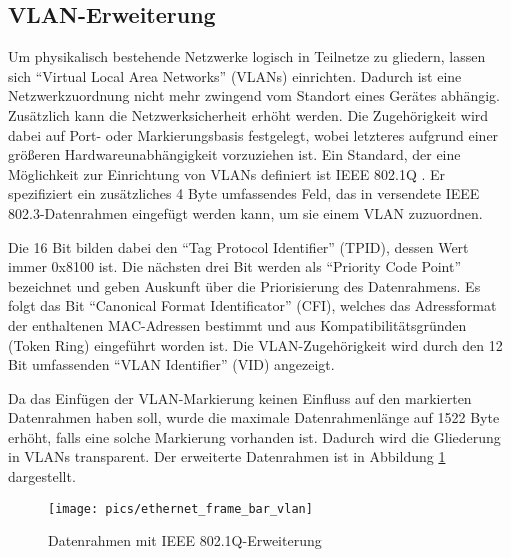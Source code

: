 \subsection{VLAN-Erweiterung}

\label{sec:grundlagen_ethernet_vlan}
Um physikalisch bestehende Netzwerke logisch in Teilnetze zu gliedern,
lassen sich ``Virtual Local Area Networks'' (VLANs)
einrichten. Dadurch ist eine Netzwerkzuordnung nicht mehr zwingend vom
Standort eines Gerätes abhängig. Zusätzlich kann die
Netzwerksicherheit erhöht werden. Die Zugehörigkeit wird dabei auf
Port- oder Markierungsbasis festgelegt, wobei letzteres
aufgrund einer größeren Hardwareunabhängigkeit vorzuziehen ist. Ein
Standard, der eine Möglichkeit zur Einrichtung von VLANs definiert ist
IEEE 802.1Q \cite{vlan2005}. Er spezifiziert ein zusätzliches 4 Byte
umfassendes Feld, das in versendete IEEE 802.3-Datenrahmen eingefügt
werden kann, um sie einem VLAN zuzuordnen. 

Die 16 Bit bilden dabei den ``Tag Protocol Identifier'' (TPID), dessen
Wert immer 0x8100 ist. Die nächsten drei Bit werden als ``Priority Code
Point'' bezeichnet und geben Auskunft über die Priorisierung des
Datenrahmens. Es folgt das Bit ``Canonical Format Identificator''
(CFI), welches das Adressformat der enthaltenen MAC-Adressen
bestimmt und aus Kompatibilitätsgründen (Token Ring) eingeführt worden
ist. Die VLAN-Zugehörigkeit wird durch den 12 Bit umfassenden ``VLAN
Identifier'' (VID) angezeigt. 

Da das Einfügen der VLAN-Markierung keinen Einfluss auf den markierten
Datenrahmen haben soll, wurde die maximale Datenrahmenlänge auf 1522
Byte erhöht, falls eine solche Markierung vorhanden ist. Dadurch wird
die Gliederung in VLANs transparent. Der erweiterte Datenrahmen ist in
Abbildung \ref{fig:grundlagen_ethernet_frame_vlan} dargestellt.

\begin{figure}[htbp]
	\centering
	\texttt{[image: pics/ethernet\_frame\_bar\_vlan]}
	\caption{Datenrahmen mit IEEE 802.1Q-Erweiterung}
	\label{fig:grundlagen_ethernet_frame_vlan}
\end{figure}

